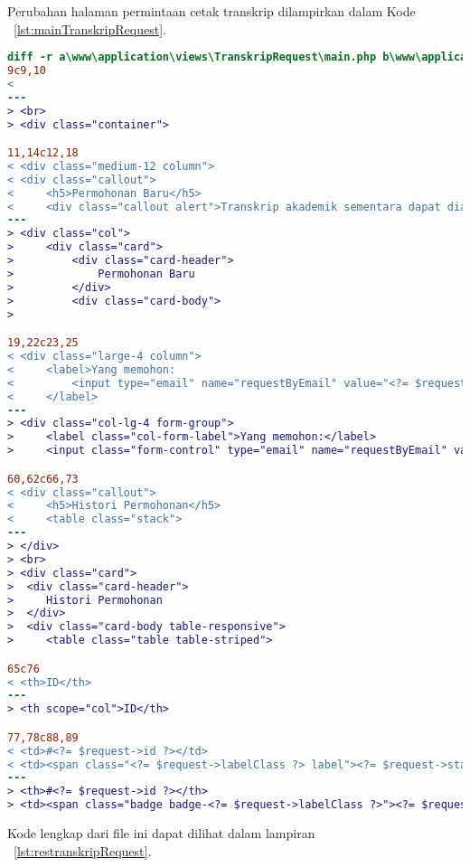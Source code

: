 Perubahan halaman permintaan cetak transkrip dilampirkan dalam Kode ~\ref{lst:mainTranskripRequest}.
\begin{lstlisting}[language=diff, caption=Perubahan file \path{\views\TranskripRequest\main.php} ,  basicstyle=\ttfamily, frame=single,
columns=fullflexible, keepspaces=true, breaklines=true, label={lst:mainTranskripRequest}]
diff -r a\www\application\views\TranskripRequest\main.php b\www\application\views\TranskripRequest\main.php
9c9,10
< 
---
> <br>
> <div class="container">

11,14c12,18
< <div class="medium-12 column">
< <div class="callout">
<     <h5>Permohonan Baru</h5>
<     <div class="callout alert">Transkrip akademik sementara dapat diakses via student portal masing-masing.</div>
---
> <div class="col">
>     <div class="card">
>         <div class="card-header">
>             Permohonan Baru
>         </div>
>         <div class="card-body">
> 

19,22c23,25
< <div class="large-4 column">
<     <label>Yang memohon:
<         <input type="email" name="requestByEmail" value="<?= $requestByEmail ?>" readonly="readonly"/>
<     </label>
---
> <div class="col-lg-4 form-group">
>     <label class="col-form-label">Yang memohon:</label>
>     <input class="form-control" type="email" name="requestByEmail" value="<?= $requestByEmail ?>" readonly/>

60,62c66,73
< <div class="callout">
<     <h5>Histori Permohonan</h5>
<     <table class="stack">
---
> </div>
> <br>
> <div class="card">
>  <div class="card-header">
>     Histori Permohonan
>  </div>
>  <div class="card-body table-responsive">
>     <table class="table table-striped">

65c76
< <th>ID</th>
---
> <th scope="col">ID</th>

77,78c88,89
< <td>#<?= $request->id ?></td>
< <td><span class="<?= $request->labelClass ?> label"><?= $request->status ?></span></td>
---
> <th>#<?= $request->id ?></th>
> <td><span class="badge badge-<?= $request->labelClass ?>"><?= $request->status ?></span></td>
\end{lstlisting}
Kode lengkap dari file ini dapat dilihat dalam lampiran ~\ref{lst:restranskripRequest}.

